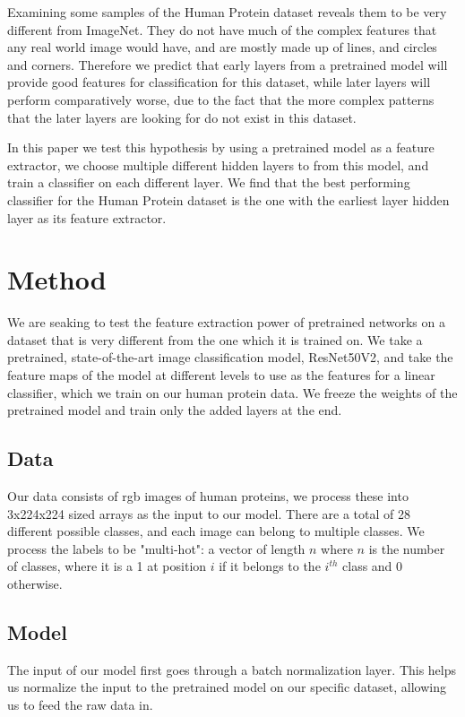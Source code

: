 \documentclass{article}
\begin{document}
Examining some samples of the Human Protein dataset reveals them to be very different from ImageNet. They 
do not have much of the complex features that any real world image would have, and are mostly made up of 
lines, and circles and corners. Therefore we predict that early layers from a pretrained model will
provide good features for classification for this dataset, while later layers will perform comparatively worse, 
due to the fact that the more complex patterns that the later layers are looking for do not exist in this 
dataset. 

In this paper we test this hypothesis by using a pretrained model as a feature extractor, we choose multiple different
hidden layers to from this model, and train a classifier on each different layer. We find that the best performing classifier
for the Human Protein dataset is the one with the earliest layer hidden layer as its feature extractor.
\section{Method}
We are seaking to test the feature extraction power of pretrained networks on 
a dataset that is very different from the one which it is trained on. We take 
a pretrained, state-of-the-art image classification model, ResNet50V2, and take
the feature maps of the model at different levels to use as the features for 
a linear classifier, which we train on our human protein data. We freeze the weights
of the pretrained model and train only the added layers at the end.
\subsection{Data}
Our data consists of rgb images of human proteins, we process these into 3x224x224 sized
arrays as the input to our model. There are a total of 28 different possible classes,
and each image can belong to multiple classes. We process the labels to be "multi-hot":
a vector of length $n$ where $n$ is the number of classes, where it is a 1 at position $i$ if 
it belongs to the $i^{th}$ class and 0 otherwise.
\subsection{Model}

The input of our model first goes through a batch normalization layer. This helps
us normalize the input to the pretrained model on our specific dataset, allowing us 
to feed the raw data in.
\end{document}
